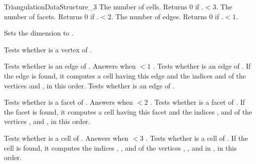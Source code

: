 \begin{ccRefConcept}{TriangulationDataStructure_3}
{The number of cells. Returns 0 if \ccVar.$<3$.}
\ccGlue
{}
{The number of facets. Returns 0 if \ccVar.$<2$.}
\ccGlue
{}
{The number of edges. Returns 0 if \ccVar.$<1$.}

\begin{ccAdvanced}
{Sets the dimension to .}
\end{ccAdvanced}


{Tests whether  is a vertex of \ccVar.}

{Tests whether  is an edge of \ccVar. Answers  when
 $<1$ .}
\ccGlue
{}
{Tests whether  is an edge of \ccVar. If the edge is found,
it computes a cell  having this edge and the indices 
and  of the vertices  and , in this order.}
\ccGlue
{}
{Tests whether  is an edge of \ccVar.}

{Tests whether  is a facet of \ccVar. Answers  when
 $<2$ .}
\ccGlue
{}
{Tests whether  is a facet of \ccVar. If the facet is found,
it computes a cell  having this facet and the indices ,
 and  of the vertices ,  and , in
this order.} 

{Tests whether  is a cell of \ccVar. Answers  when
 $<3$ .}
{Tests whether  is a cell of \ccVar. If the cell
 is found, it computes the indices , , 
and  of the vertices , ,  and  in
, in this order.} 


\end{ccRefConcept}
